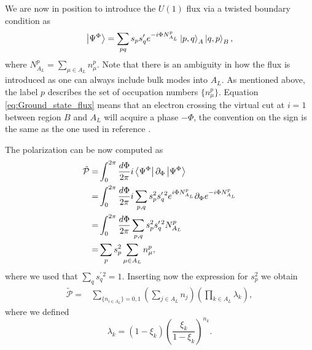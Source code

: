 \documentclass[twocolumn,amsmath,longbibliography,amssymb,superscriptaddress]{revtex4-1}
\begin{document}
We are now in position to introduce the $U(1)$ flux via a twisted boundary condition as
\begin{equation}
\ket{\Psi^\Phi} = \sum_{pq} s_p s_q' e^{-i\Phi N_{A_L}^p} \ket{p,q}_A \ket{q,p}_B,
\label{eq:Ground_state_flux}
\end{equation}
where $N_{A_L}^p = \sum_{\mu \in A_L}n_\mu^p$. Note that there is an ambiguity in how the flux is introduced as one can always include bulk modes into $A_L$. As mentioned above, the label $p$ describes the set of occupation numbers $\{n_\mu^p\}$. Equation \eqref{eq:Ground_state_flux} means that an electron crossing the virtual cut at $i=1$ between region $B$ and $A_L$ will acquire a phase $-\Phi$, the convention on the sign is the same as the one used in reference \cite{Watanabe2018}. 

The polarization can be now computed as
\begin{align}
\tilde{\mathcal{P}} =& \int_0^{2\pi} \frac{d\Phi}{2\pi}i\bra{\Psi^\Phi}\partial_\Phi\ket{\Psi^\Phi} \\
=& \int_0^{2\pi} \frac{d\Phi}{2\pi}i\sum_{p,q} s_p^2 s_q^{\prime \, 2} e^{i\Phi N_{A_L}^p}\partial_{\Phi}e^{-i\Phi  N_{A_L}^p}\\
=&\int_0^{2\pi} \frac{d\Phi}{2\pi}\sum_{p,q} s_p^2 s_q^{\prime \, 2}  N_{A_L}^p\\
=&\sum_{p} s_p^2 \sum_{\mu \in A_L}n^p_\mu,
\end{align}
where we used that $\sum_q s_q^{\prime \,2} = 1$. Inserting now the expression for $s_p^2$ we obtain
\begin{align}
\tilde{\mathcal{P}}=&\sum_{\{n_{i \in A_L}\} = 0,1} \left(\sum_{j\in A_{L}} n_j \right) \left(\prod_{k\in A_L} \lambda_k \right),
\end{align} 
where we defined
\begin{equation}
\lambda_k = (1- \xi_k)\left(\frac{\xi_k}{1-\xi_k} \right)^{n_k}.
\end{equation}
\end{document}
